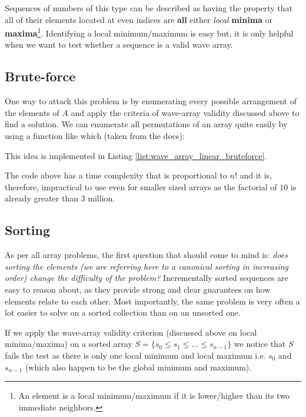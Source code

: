 Sequences of numbers of this type can be described as having the property that all of their elements located at even indices are \textbf{all} either 
\textit{local}  \textbf{minima} or  \textbf{maxima}\footnote{An element is a local minimum/maximum if it is lower/higher than its two immediate neighbors.}. 
Identifying a local minimum/maximum is easy but, it is only helpful when we want to test whether a sequence is a valid wave array.

\subsection{Brute-force}
\label{wave_array:sec:bruteforce}
One way to attack this problem is by enumerating every possible arrangement of the elements of $A$ and apply the criteria of wave-array validity discussed above to find a solution. 
We can enumerate all permutations of an array quite easily by using a function like  which (taken from the docs): \quoteblock{"Rearranges the elements in the range [first,last) into the next lexicographically greater permutation".}

This idea is implemented in Listing \ref{list:wave_array_linear_bruteforce}.



The code above has a time complexity that is proportional to $n!$ and it is, therefore, impractical to use even for smaller sized arrays as the factorial of $10$ is already greater than $3$ million. 

\subsection{Sorting}
\label{wave_array:sec:sorting}
As per all array problems, the first question that should come to mind is: \textit{does sorting the elements (we are referring here to a canonical sorting in increasing order) change the difficulty of the problem?}
Incrementally sorted sequences are easy to reason about, as they provide strong and clear guarantees on how elements relate to each other. Most importantly, the same problem is very often a lot easier to solve on a sorted collection than on an unsorted one.
 
If we apply the wave-array validity criterion (discussed above on local minima/maxima) on a sorted array $S=\{s_0 \leq s_1 \leq \ldots \leq s_{n-1}\}$ we notice that $S$ fails the test as there is only one local minimum and local maximum i.e. $s_0$ and $s_{n-1}$ (which also happen to be the global minimum and maximum).

